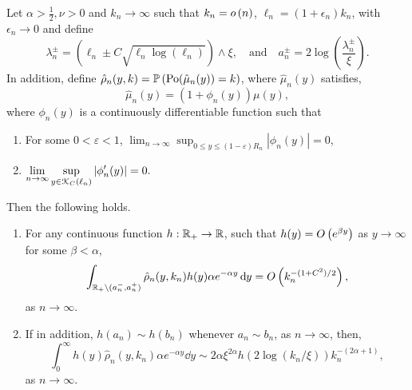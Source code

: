 \begin{lemma}\label{lem:concentration_argument_rho_approximation}
Let $\alpha > \frac{1}{2}, \nu > 0$ and $k_n \to \infty$ such that $k_n = o\left(n\right)$, $\ell_n = (1 + \epsilon_n)k_n$, with $\epsilon_n \to 0$ and define
\[
	\lambda_n^\pm = (\ell_n \pm C \sqrt{\ell_n \log(\ell_n)}) \wedge \xi, \quad \text{and} \quad a_n^\pm = 2 \log\left(\frac{\lambda_n^\pm}{\xi}\right).
\] 
In addition, define $\hat{\rho}_n(y,k) = \mathbb{P}\left({\mathrm{Po}}(\hat{\mu}_n(y)) = k\right)$, where $\hat{\mu}_n(y)$ satisfies, 
\[
	\hat{\mu}_n(y) = (1 + \phi_n(y))\mu(y),
\]
where $\phi_n(y)$ is a continuously differentiable function such that
\begin{enumerate}[\upshape i)]
\item For some $0 < \varepsilon < 1$, $\displaystyle \lim_{n \to \infty} \sup_{0 \le y \le (1 - \varepsilon)R_n} |\phi_n(y)| = 0$,
\item $\displaystyle \lim_{n \to \infty}  \sup_{y \in {\mathcal K}_{C}(\ell_n)} |\phi_n^\prime(y)| = 0.$
\end{enumerate}
Then the following holds.
\begin{enumerate}
\item For any continuous function $h : {\mathbb R}_+ \rightarrow  {\ensuremath{\mathbb R}}$, such that $h(y) = O\left(e^{\beta y}\right)$ as $y \to \infty$ for some $\beta < \alpha$, 
\begin{equation}\label{eq:error_bound_int_rho_approx_not_K}
	\int_{{\mathbb R}_+ \setminus (a_n^-, a_n^+)} \hat{\rho}_n(y,k_n) h(y) \alpha e^{-\alpha y} \operatorname{\mathrm{d}\hspace{-2pt}} y
	= O\left(k_n^{-(1+C^2)/2}\right),
\end{equation}
as $n \to \infty$.
\item If in addition, $h(a_n) \sim h(b_n)$ whenever $a_n \sim b_n$, as $n \to \infty$, then,
\begin{equation}\label{eq:concentration_h_rho_approx}
	\int_0^\infty h(y) \hat{\rho}_n(y,k_n) \alpha e^{-\alpha y} \dd y \sim  
		2\alpha \xi^{2\alpha} h(2\log(k_n/\xi)) k_n^{-(2\alpha + 1)},
\end{equation}
as $n \to \infty$.
\end{enumerate}
\end{lemma}

